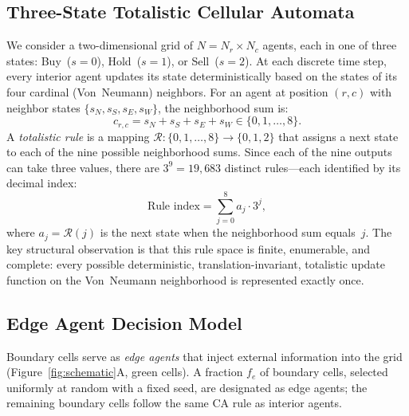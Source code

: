 \documentclass{article}
\theoremstyle{definition}
\theoremstyle{remark}
\begin{document}
\subsection{Three-State Totalistic Cellular Automata}
\label{sec:ca-rules}
We consider a two-dimensional grid of $N = N_r \times N_c$ agents, each in one of three
states: Buy~($s=0$), Hold~($s=1$), or Sell~($s=2$). At each discrete time step, every
interior agent updates its state deterministically based on the states of its four
cardinal (Von~Neumann) neighbors. For an agent at position $(r,c)$ with
neighbor states $\{s_N, s_S, s_E, s_W\}$, the neighborhood sum is:
\begin{equation}
  c_{r,c} = s_N + s_S + s_E + s_W \in \{0, 1, \ldots, 8\}.
  \label{eq:neighborhood-sum}
\end{equation}
A \emph{totalistic rule} is a mapping $\mathcal{R}: \{0,1,\ldots,8\} \to \{0,1,2\}$ that
assigns a next state to each of the nine possible neighborhood sums. Since each of the
nine outputs can take three values, there are $3^9 = 19{,}683$ distinct rules---each
identified by its decimal index:
\begin{equation}
  \text{Rule index} = \sum_{j=0}^{8} a_j \cdot 3^j,
  \label{eq:rule-index}
\end{equation}
where $a_j = \mathcal{R}(j)$ is the next state when the neighborhood sum equals~$j$.
The key structural observation is that this rule space is finite, enumerable, and
complete: every possible deterministic, translation-invariant, totalistic update function
on the Von~Neumann neighborhood is represented exactly once.

\subsection{Edge Agent Decision Model}
\label{sec:edge-agents}
Boundary cells serve as \emph{edge agents} that inject external information into the
grid (Figure~\ref{fig:schematic}A, green cells). A fraction $f_e$ of boundary cells,
selected uniformly at random with a fixed seed, are designated as edge agents; the
remaining boundary cells follow the same CA rule as interior agents.
\end{document}
